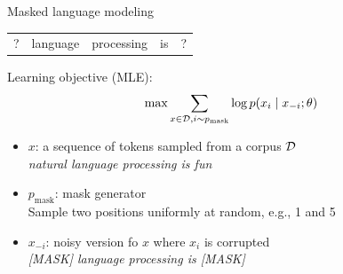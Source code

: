 \documentclass[usenames,dvipsnames,notes,11pt,aspectratio=169,hyperref={colorlinks=true, linkcolor=blue}]{beamer}
\begin{document}
\begin{frame}
    {Masked language modeling}

    \begin{tabular}{ccccc}
        ? & language & processing & is & ?
    \end{tabular}

    \pause\medskip
    Learning objective (MLE):\\
    $$
    \max \sum_{x\in\mathcal{D}, i\sim p_{\text{mask}}} \log p(x_i\mid x_{-i}; \theta)
    $$
    \vspace{-1em}
    \begin{itemize}
        \item $x$: a sequence of tokens sampled from a corpus $\mathcal{D}$\\
            {\em natural language processing is fun}
        \item $p_{\text{mask}}$: mask generator\\
            Sample two positions uniformly at random, e.g., 1 and 5
        \item $x_{-i}$: noisy version fo $x$ where $x_i$ is corrupted\\
            {\em [MASK] language processing is [MASK]}
    \end{itemize}
\end{frame}
\end{document}
